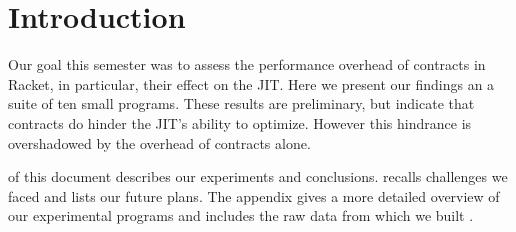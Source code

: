 \section{Introduction}
\label{intro}

Our goal this semester was to assess the performance overhead of contracts in Racket, in particular, their effect on the JIT.
Here we present our findings an a suite of ten small programs.
These results are preliminary, but indicate that contracts do hinder the JIT's ability to optimize.
However this hindrance is overshadowed by the overhead of contracts alone.

 of this document describes our experiments and conclusions.
 recalls challenges we faced and lists our future plans.
The appendix gives a more detailed overview of our experimental programs and includes the raw data from which we built .
